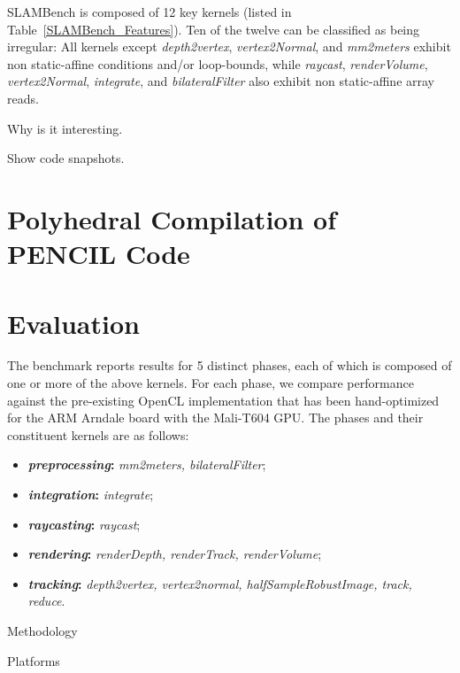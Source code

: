 \documentclass{llncs}
\begin{document}
SLAMBench is composed of 12 key kernels (listed in
Table~\ref{SLAMBench_Features}). 
Ten of the twelve can be classified as being irregular:
All kernels except \textit{depth2vertex}, \textit{vertex2Normal},
and \textit{mm2meters} exhibit non static-affine conditions and/or
loop-bounds, while \textit{raycast}, \textit{renderVolume},
\textit{vertex2Normal}, \textit{integrate}, and
\textit{bilateralFilter} also exhibit non static-affine array reads.


Why is it interesting.


Show code snapshots.


\section{Polyhedral Compilation of PENCIL Code}







\section{Evaluation}
\label{slambench}

The benchmark reports results for 5 distinct phases, each of which
is composed of one or more of the above kernels.
For each phase, we compare performance against the pre-existing OpenCL
implementation that has been hand-optimized for the ARM Arndale board
with the Mali-T604 GPU. The phases and their constituent kernels are
as follows:

\begin{itemize}
\item \textbf{\textit{preprocessing}:} \textit{mm2meters, bilateralFilter};
\item \textbf{\textit{integration}:} \textit{integrate};
\item \textbf{\textit{raycasting}:} \textit{raycast};
\item \textbf{\textit{rendering}:} \textit{renderDepth, renderTrack, renderVolume};
\item \textbf{\textit{tracking}:} \textit{depth2vertex, vertex2normal,
      halfSampleRobustImage, track, reduce}.
\end{itemize}


Methodology


Platforms
\end{document}
